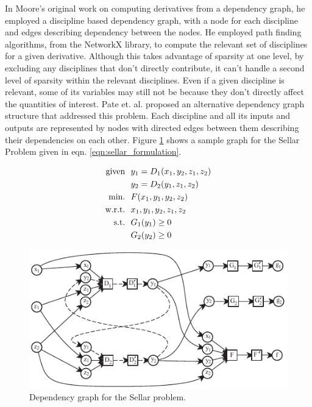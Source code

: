 \documentclass[]{aiaa-tc} %
\newcommand{\txt}{\textrm}
\begin{document}
    In Moore's original work on computing derivatives from a dependency graph, he employed
    a discipline based dependency graph, with a node for each discipline and edges describing
    dependency between the nodes. He employed path finding algorithms, from the NetworkX library\cite{hagberg-2008-exploring},
    to compute the relevant set of disciplines for a given derivative. Although this takes advantage of sparsity at
    one level, by excluding any disciplines that don't directly contribute, it can't handle a second level of sparsity
    within the relevant disciplines. Even if a given discipline is relevant, some of its variables may still not be
    because they don't directly affect the quantities of interest. Pate et. al. proposed an alternative dependency graph
    structure that addressed this problem\cite{graph_problem2013}. Each discipline and all its inputs and outputs are
    represented by nodes with directed edges between them describing their dependencies on each other.
    Figure \ref{fig:sellar_graph} shows a sample graph for the Sellar Problem \cite{AIAA:sellar}
    given in eqn. \ref{eqn:sellar_formulation}.

    \begin{align}
        \txt{given} & \ \ y_1 = D_1(x_1,y_2,z_1,z_2) \notag
        \\      & \ \ y_2 = D_2(y_1,z_1,z_2) \notag
        \\\txt{min.} &\ \ F(x_1,y_1,y_2,z_2) \notag
        \\\txt{w.r.t.} & \ \ x_1,y_1,y_2,z_1,z_2 \notag
        \\\txt{s.t.} & \ \ G_1(y_1) \geq 0 \notag
        \\     & \ \ G_2(y_2) \geq 0
        \label{eqn:sellar_formulation}
    \end{align}

    \begin{figure}[!htb]\begin{center}
      \includegraphics[width=.8\textwidth]{images/sellar_cycles}
      \caption{ Dependency graph for the Sellar problem. \label{fig:sellar_graph}}
    \end{center}\end{figure}
\end{document}
